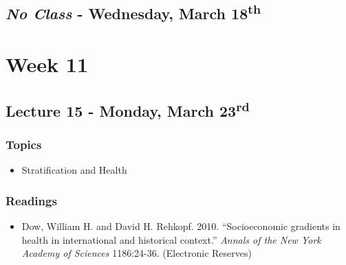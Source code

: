 \documentclass[]{book}
\providecommand{\tightlist}{%
  \setlength{\itemsep}{0pt}\setlength{\parskip}{0pt}}
\begin{document}
\hypertarget{no-class---wednesday-march-18th}{%
\subsection*{\texorpdfstring{\emph{No Class} - Wednesday, March 18\textsuperscript{th}}{No Class - Wednesday, March 18th}}\label{no-class---wednesday-march-18th}}

\newpage

\hypertarget{week-11}{%
\section*{Week 11}\label{week-11}}

\hypertarget{lecture-15---monday-march-23rd}{%
\subsection*{\texorpdfstring{Lecture 15 - Monday, March 23\textsuperscript{rd}}{Lecture 15 - Monday, March 23rd}}\label{lecture-15---monday-march-23rd}}

\hypertarget{topics-18}{%
\subsubsection*{Topics}\label{topics-18}}

\begin{itemize}
\tightlist
\item
  Stratification and Health
\end{itemize}

\hypertarget{readings-17}{%
\subsubsection*{Readings}\label{readings-17}}

\begin{itemize}
\tightlist
\item
  Dow, William H. and David H. Rehkopf. 2010. ``Socioeconomic gradients in health in international and historical context.'' \emph{Annals of the New York Academy of Sciences} 1186:24-36. (Electronic Reserves)
\end{itemize}
\end{document}
